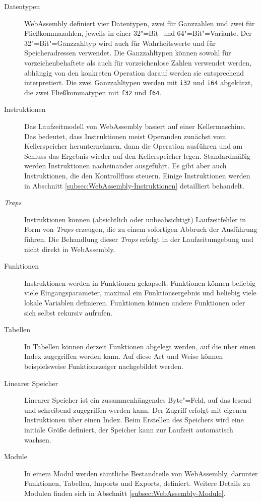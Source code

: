 \begin{description}
    \item[Datentypen] WebAssembly definiert vier Datentypen, zwei für Ganzzahlen und zwei für Fließkommazahlen, jeweils in einer 32"=Bit- und 64"=Bit"=Variante. Der 32"=Bit"=Ganzzahltyp wird auch für Wahrheitswerte und für Speicheradressen verwendet. Die Ganzzahltypen können sowohl für vorzeichenbehaftete als auch für vorzeichenlose Zahlen verwendet werden, abhängig von den konkreten Operation darauf werden sie entsprechend interpretiert. Die zwei Ganzzahltypen werden mit \lstinline{i32} und \lstinline{i64} abgekürzt, die zwei Fließkommatypen mit \lstinline{f32} und \lstinline{f64}.
    \item[Instruktionen] Das Laufzeitmodell von WebAssembly basiert auf einer Kellermaschine. Das bedeutet, dass Instruktionen meist Operanden zunächst vom Kellerspeicher herunternehmen, dann die Operation ausführen und am Schluss das Ergebnis wieder auf den Kellerspeicher legen. Standardmäßig werden Instruktionen nacheinander ausgeführt. Es gibt aber auch Instruktionen, die den Kontrollfluss steuern. Einige Instruktionen werden in Abschnitt \ref{subsec:WebAssembly-Instruktionen} detailliert behandelt.
    \item[\emph{Traps}] Instruktionen können (absichtlich oder unbeabsichtigt) Laufzeitfehler in Form von \emph{Traps} erzeugen, die zu einem sofortigen Abbruch der Ausführung führen. Die Behandlung dieser \emph{Traps} erfolgt in der Laufzeitumgebung und nicht direkt in WebAssembly.
    \item[Funktionen] Instruktionen werden in Funktionen gekapselt. Funktionen können beliebig viele Eingangsparameter, maximal ein Funktionsergebnis und beliebig viele lokale Variablen definieren. Funktionen können andere Funktionen oder sich selbst rekursiv aufrufen.
    \item[Tabellen] In Tabellen können derzeit Funktionen abgelegt werden, auf die über einen Index zugegriffen werden kann. Auf diese Art und Weise können beispielsweise Funktionszeiger nachgebildet werden. 
    \item[Linearer Speicher] Linearer Speicher ist ein zusammenhängendes Byte"=Feld, auf das lesend und schreibend zugegriffen werden kann. Der Zugriff erfolgt mit eigenen Instruktionen über einen Index. Beim Erstellen des Speichers wird eine initiale Größe definiert, der Speicher kann zur Laufzeit automatisch wachsen.
    \item[Module] In einem Modul werden sämtliche Bestandteile von WebAssembly, darunter Funktionen, Tabellen, Imports und Exports, definiert. Weitere Details zu Modulen finden sich in Abschnitt \ref{subsec:WebAssembly-Module}.
\end{description}

